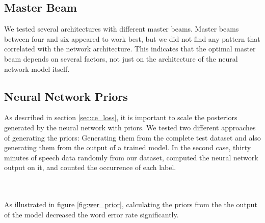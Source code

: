 \subsection{Master Beam}
We tested several architectures with different master beams. Master beams between four and six appeared to work best, but we did not find any pattern that correlated with the network architecture. This indicates that the optimal master beam depends on several factors, not just on the architecture of the neural network model itself. 
\subsection{Neural Network Priors}
As described in section \ref{sec:ce_loss}, it is important to scale the posteriors generated by the neural network with priors. We tested two different approaches of generating the priors: Generating them from the complete test dataset and also generating them from the output of a trained model. In the second case, thirty minutes of speech data randomly from our dataset, computed the neural network output on it, and counted the occurrence of each label. \\ \\
\begin{minipage}{\linewidth}
	\centering
	\label{fig:wer_priors}
\end{minipage} 
\\
As illustrated in figure \ref{fig:wer_prior}, calculating the priors from the the output of the model decreased the word error rate significantly. 
